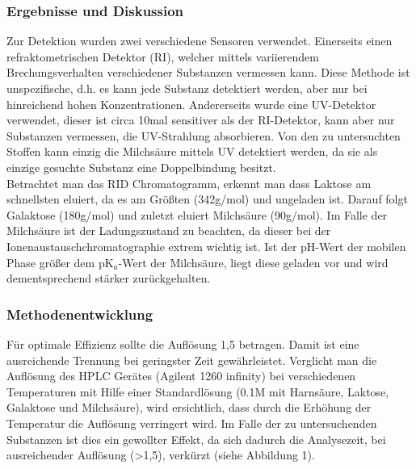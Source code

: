 \subsubsection{Ergebnisse und Diskussion}
Zur Detektion wurden zwei verschiedene Sensoren verwendet. Einerseits einen refraktometrischen Detektor (RI), welcher mittels variierendem Brechungsverhalten verschiedener Substanzen vermessen kann. Diese Methode ist unspezifische, d.h. es kann jede Substanz detektiert werden, aber nur bei hinreichend hohen Konzentrationen. Andererseits wurde eine UV-Detektor verwendet, dieser ist circa 10mal sensitiver als der RI-Detektor, kann aber nur Substanzen vermessen, die UV-Strahlung absorbieren. Von den zu untersuchten Stoffen kann einzig die Milchsäure mittels UV detektiert werden, da sie als einzige gesuchte Substanz eine Doppelbindung besitzt. \\
Betrachtet man das RID Chromatogramm, erkennt man dass Laktose am schnellsten eluiert, da es am Größten (342g/mol) und ungeladen ist. Darauf folgt Galaktose (180g/mol) und zuletzt eluiert Milchsäure (90g/mol). Im Falle der Milchsäure ist der Ladungszustand zu beachten, da dieser bei der Ionenaustauschchromatographie extrem wichtig ist. Ist der pH-Wert der mobilen Phase größer dem pK$_a$-Wert der Milchsäure, liegt diese geladen vor und wird dementsprechend stärker zurückgehalten.



\subsubsection{Methodenentwicklung}
Für optimale Effizienz sollte die Auflösung 1,5 betragen. Damit ist eine ausreichende Trennung bei geringster Zeit gewährleistet. Verglicht man die Auflösung des HPLC Gerätes (Agilent 1260 infinity) bei verschiedenen Temperaturen mit Hilfe einer Standardlösung (0.1M mit Harnsäure, Laktose, Galaktose und Milchsäure), wird ersichtlich, dass durch die Erhöhung der Temperatur die Auflösung verringert wird. Im Falle der zu untersuchenden Substanzen ist dies ein gewollter Effekt, da sich dadurch die Analysezeit, bei ausreichender Auflösung (>1,5), verkürzt (siehe Abbildung 1). 